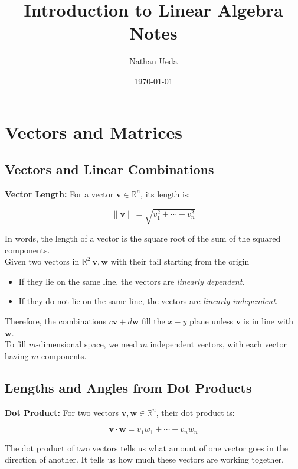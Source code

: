 \documentclass[11pt]{article}
\title{Introduction to Linear Algebra Notes}
\author{Nathan Ueda}
\date{\today}
\begin{document}
\maketitle 
\pagebreak
\tableofcontents 
\pagebreak

\section{Vectors and Matrices}
\subsection{Vectors and Linear Combinations}

\textbf{Vector Length:} For a vector $ \boldsymbol{v} \in \mathbb{R}^n $, its length is:

\[ \|\boldsymbol{v}\|= \sqrt{v_1^2 + \cdots + v_n^2} \]

In words, the length of a vector is the square root of the sum of the squared components. \\

Given two vectors in $\mathbb{R}^2\ \boldsymbol{v}, \boldsymbol{w}$ with their tail starting 
from the origin
\begin{itemize}
    \item If they lie on the same line, the vectors are \textit{linearly dependent}.
    \item If they do not lie on the same line, the vectors are \textit{linearly independent}.
\end{itemize}
Therefore, the combinations $ c\boldsymbol{v} + d\boldsymbol{w} $ fill the $x-y$ plane unless 
$\boldsymbol{v}$ is in line with $\boldsymbol{w}$. \\

To fill $m$-dimensional space, we need $m$ independent vectors, with each vector having $m$
components.

\subsection{Lengths and Angles from Dot Products}

\textbf{Dot Product:} For two vectors $\boldsymbol{v}, \boldsymbol{w} \in \mathbb{R}^n$, their
dot product is:

\[ \boldsymbol{v} \cdot \boldsymbol{w} = v_1 w_1 + \cdots + v_n w_n \]

The dot product of two vectors tells us what amount of one vector goes in the direction of
another. It tells us how much these vectors are working together.
\end{document}
